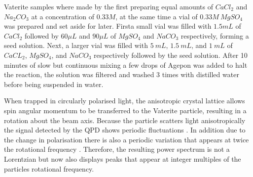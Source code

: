Vaterite samples where made by the first preparing equal amounts 
of $CaCl_2$ and $Na_2CO_3$ at a concentration of $0.33M$, at 
the same time a vial of $0.33M\ MgSO_4$ was prepared and set 
aside for later. Firsta small vial was filled with $1.5mL$ of 
$CaCl_2$ followed by $60\mu L$ and $90\mu L$ of $MgSO_4$ and 
$NaCO_3$ respectively, forming a seed solution. Next, a larger 
vial was filled with $5\ mL$, $1.5\ mL$, and $1\ mL$ of $CaCL_2$, 
$MgSO_4$, and $NaCO_3$ respectively followed by the seed solution. 
After 10 minutes of slow but continuous mixing a few drops of 
Agepon was added to halt the reaction, the solution was filtered 
and washed 3 times with distilled water before being suspended 
in water.
 
When trapped in circularly polarised light, the anisotropic 
crystal lattice allows spin angular momentum to be transferred 
to the Vaterite particle, resulting in a rotation about the 
beam axis. Because the particle scatters light anisotropically 
the signal detected by the QPD shows periodic fluctuations 
\cite{Yogesha2012}. In addition due to the change in polarisation 
there is also a periodic variation that appears at twice the 
rotational frequency \cite{Monteiro2018}. Therefore, the resulting 
power spectrum is not a Lorentzian but now also displays peaks 
that appear at integer multiples of the particles rotational 
frequency. 
